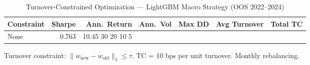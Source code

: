 \begin{table}[htbp]
\centering
\caption{Turnover-Constrained Optimization --- LightGBM Macro Strategy (OOS 2022--2024)}
\label{tab:turnover_constraint}
\begin{tabular}{lrrrrrr}
\toprule
Constraint & Sharpe & Ann.\ Return & Ann.\ Vol & Max DD & Avg Turnover & Total TC \\
\midrule
None & 0.763 & 10.45%
30%
20%
10%
5%
\bottomrule
\end{tabular}
\begin{tablenotes}
\small
\item Turnover constraint: $\|w_{\text{new}} - w_{\text{old}}\|_1 \le \tau$. TC = 10 bps per unit turnover. Monthly rebalancing.
\end{tablenotes}
\end{table}